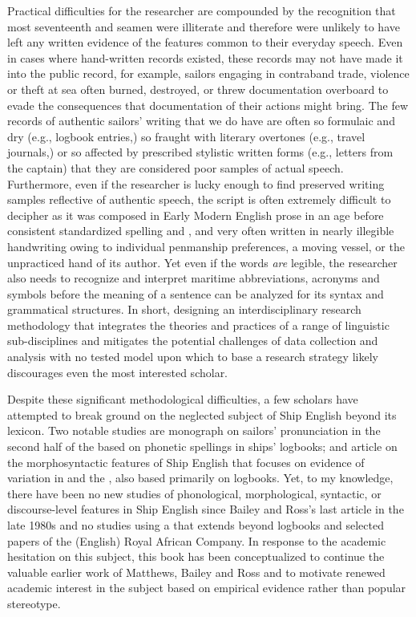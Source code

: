 Practical difficulties for the researcher are compounded by the recognition that most seventeenth and  seamen were illiterate \citep[167]{Kelly2006} and therefore were unlikely to have left any written evidence of the features common to their everyday speech. Even in cases where hand-written records existed, these records may not have made it into the public record, for example, sailors engaging in contraband trade, violence or theft at sea often burned, destroyed, or threw documentation overboard to evade the consequences that documentation of their actions might bring. The few records of authentic sailors’ writing that we do have are often so formulaic and dry (e.g., logbook entries,) so fraught with literary overtones (e.g., travel journals,) or so affected by prescribed stylistic written forms (e.g., letters from the captain) that they are considered poor samples of actual speech. Furthermore, even if the researcher is lucky enough to find preserved writing samples reflective of authentic speech, the script is often extremely difficult to decipher as it was composed in Early Modern English prose in an age before consistent standardized spelling and , and very often written in nearly illegible handwriting owing to individual penmanship preferences, a moving vessel, or the unpracticed hand of its author. Yet even if the words \textit{are} legible, the researcher also needs to recognize and interpret maritime abbreviations, acronyms and symbols before the meaning of a sentence can be analyzed for its syntax and grammatical structures. In short, designing an interdisciplinary research methodology that integrates the theories and practices of a range of linguistic sub-disciplines and mitigates the potential challenges of data collection and analysis with no tested model upon which to base a research strategy likely discourages even the most interested scholar. 



Despite these significant methodological difficulties, a few scholars have attempted to break ground on the neglected subject of Ship English beyond its lexicon. Two notable studies are  monograph on sailors’ pronunciation in the second half of the  based on phonetic spellings in ships’ logbooks; and  article on the morphosyntactic features of Ship English that focuses on evidence of variation in  and the , also based primarily on logbooks. Yet, to my knowledge, there have been no new studies of phonological, morphological, syntactic, or discourse-level features in Ship English since Bailey and Ross’s last article in the late 1980s and no studies using a  that extends beyond logbooks and selected papers of the (English) Royal African Company. In response to the academic hesitation on this subject, this book has been conceptualized to continue the valuable earlier work of Matthews, Bailey and Ross and to motivate renewed academic interest in the subject based on empirical evidence rather than popular stereotype.  



